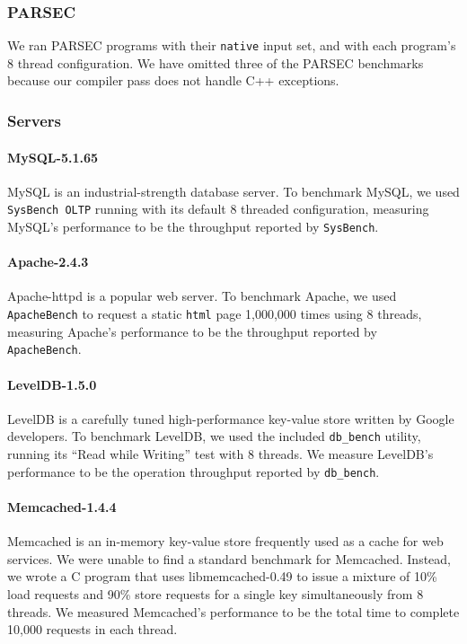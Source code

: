 \documentclass[preprint,9pt]{sigplanconf}
\begin{document}
\subsubsection{PARSEC}

We ran PARSEC programs with their {\tt native} input set, and with each
program's 8 thread configuration. We have omitted three of the PARSEC
benchmarks because our compiler pass does not handle C++ exceptions.    

\subsubsection{Servers}


\paragraph{MySQL-5.1.65} MySQL is an industrial-strength database
server. To benchmark MySQL, we used {\tt SysBench OLTP} running with its
default 8 threaded configuration, measuring MySQL's performance to be the
throughput reported by {\tt SysBench}.  

\paragraph{Apache-2.4.3} 
Apache-httpd is a popular web server.  To benchmark Apache, we used {\tt
ApacheBench} to request a static {\tt html} page 1,000,000 times using 8
threads, measuring Apache's performance to be the throughput reported by {\tt
ApacheBench}.  

\paragraph{LevelDB-1.5.0}
LevelDB is a carefully tuned high-performance key-value store written by Google
developers. To benchmark LevelDB, we used the included {\tt db\_bench} utility,
running its ``Read while Writing'' test with 8 threads.  We measure LevelDB's
performance to be the operation throughput reported by {\tt db\_bench}.

\paragraph{Memcached-1.4.4}
Memcached is an in-memory key-value store frequently used as a cache for web
services.  We were unable to find a standard benchmark for Memcached.  Instead,
we wrote a C program that uses libmemcached-0.49 to issue a
mixture of 10\% load requests and 90\% store requests for a single key 
simultaneously from 8 threads.  We measured Memcached's performance to be the
total time to complete 10,000 requests in each thread.
\end{document}
